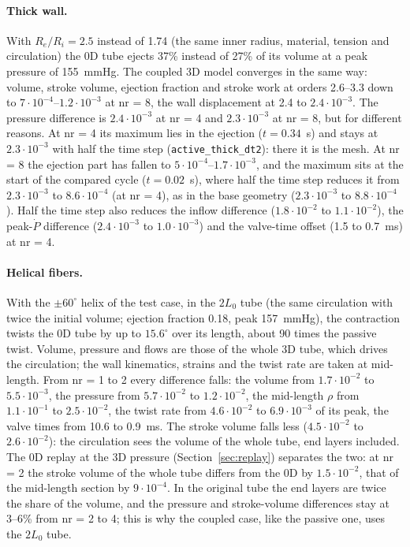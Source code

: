 \paragraph{Thick wall.} With $R_e/R_i = 2.5$ instead of 1.74 (the same inner radius,
material, tension and circulation) the 0D tube ejects 37\% instead of 27\% of its volume
at a peak pressure of 155~mmHg. The coupled 3D model converges in the same way: volume,
stroke volume, ejection fraction and stroke work at orders 2.6--3.3 down to
$7\cdot10^{-4}$--$1.2\cdot10^{-3}$ at nr = 8, the wall displacement at 2.4 to
$2.4\cdot10^{-3}$. The pressure difference is $2.4\cdot10^{-3}$ at nr = 4 and
$2.3\cdot10^{-3}$ at nr = 8, but for different reasons. At nr = 4 its maximum lies in the
ejection ($t = 0.34$~s) and stays at $2.3\cdot10^{-3}$ with half the time step
(\texttt{active\_thick\_dt2}): there it is the mesh. At nr = 8 the ejection part has
fallen to $5\cdot10^{-4}$--$1.7\cdot10^{-3}$, and the maximum sits at the start of the
compared cycle ($t = 0.02$~s), where half the time step reduces it from $2.3\cdot10^{-3}$ to
$8.6\cdot10^{-4}$ (at nr = 4), as in the base geometry ($2.3\cdot10^{-3}$ to
$8.8\cdot10^{-4}$). Half the time step also reduces the inflow difference
($1.8\cdot10^{-2}$ to $1.1\cdot10^{-2}$), the peak-$\dot P$ difference ($2.4\cdot10^{-3}$ to
$1.0\cdot10^{-3}$) and the valve-time offset (1.5 to 0.7~ms) at nr = 4.

\paragraph{Helical fibers.} With the $\pm60^\circ$ helix of the test case, in the $2L_0$ tube
(the same circulation with twice the initial volume; ejection fraction 0.18, peak
157~mmHg), the contraction twists the 0D tube by up to $15.6^\circ$ over its length, about
90 times the passive twist. Volume, pressure and flows are those of the whole 3D tube,
which drives the circulation; the wall kinematics, strains and the twist rate are taken
at mid-length. From nr = 1 to 2 every difference falls: the volume from $1.7\cdot10^{-2}$ to
$5.5\cdot10^{-3}$, the pressure from $5.7\cdot10^{-2}$ to $1.2\cdot10^{-2}$, the mid-length
$\rho$ from $1.1\cdot10^{-1}$ to $2.5\cdot10^{-2}$, the twist rate from $4.6\cdot10^{-2}$ to
$6.9\cdot10^{-3}$ of its peak, the valve times from 10.6 to 0.9~ms. The stroke volume falls
less ($4.5\cdot10^{-2}$ to $2.6\cdot10^{-2}$): the circulation sees the volume of the whole
tube, end layers included. The 0D replay at the 3D pressure (Section~\ref{sec:replay})
separates the two: at nr = 2 the stroke volume of the whole tube differs from the 0D by
$1.5\cdot10^{-2}$, that of the mid-length section by $9\cdot10^{-4}$. In the original tube
the end layers are twice the share of the volume, and the pressure and stroke-volume
differences stay at 3--6\% from nr = 2 to 4; this is why the coupled case, like the passive
one, uses the $2L_0$ tube.
